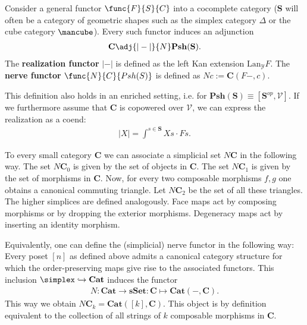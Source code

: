     \begin{construct}\label{model:nerve_and_realization}
        Consider a general functor $\func{F}{S}{C}$ into a cocomplete category ($\mathbf{S}$ will often be a category of geometric shapes such as the simplex category $\Delta$ or the cube category $\mbox{\mancube}$). Every such functor induces an adjunction
        \begin{gather}
            \mathbf{C}\adj{|-|}{N}\mathbf{Psh}(\mathbf{S}).
        \end{gather}
        The \textbf{realization functor} $|-|$ is defined as the left Kan extension $\text{Lan}_{\mathcal{Y}}F$. The \textbf{nerve functor} $\func{N}{C}{Psh(S)}$ is defined as $Nc := \mathbf{C}(F-, c)$.

        This definition also holds in an enriched setting, i.e. for  $\mathbf{Psh}(\mathbf{S})\equiv[\mathbf{S}^{op},\mathcal{V}]$. If we furthermore assume that $\mathbf{C}$ is copowered over $\mathcal{V}$, we can express the realization as a coend:
        \begin{gather}
            |X| = \int^{s\in\mathbf{S}}Xs\cdot Fs.
        \end{gather}
    \end{construct}

    \begin{example}\label{model:nerve}
        To every small category \textbf{C} we can associate a simplicial set $N\mathbf{C}$ in the following way. The set $N\mathbf{C}_0$ is given by the set of objects in $\mathbf{C}$. The set $N\mathbf{C}_1$ is given by the set of morphisms in $\mathbf{C}$. Now, for every two composable morphisms $f, g$ one obtains a canonical commuting triangle. Let $N\mathbf{C}_2$ be the set of all these triangles. The higher simplices are defined analogously. Face maps act by composing morphisms or by dropping the exterior morphisms. Degeneracy maps act by inserting an identity morphism.

        Equivalently, one can define the (simplicial) nerve functor in the following way: Every poset $[n]$ as defined above admits a canonical category structure for which the order-preserving maps give rise to the associated functors. This inclusion $\simplex\hookrightarrow\mathbf{Cat}$ induces the functor
        \begin{gather}
            N:\mathbf{Cat}\rightarrow\mathbf{sSet}:\mathbf{C}\mapsto\mathbf{Cat}(-, \mathbf{C}).
        \end{gather}
        This way we obtain $N\mathbf{C}_k=\mathbf{Cat}([k], \mathbf{C})$. This object is by definition equivalent to the collection of all strings of $k$ composable morphisms in $\mathbf{C}$.
    \end{example}

